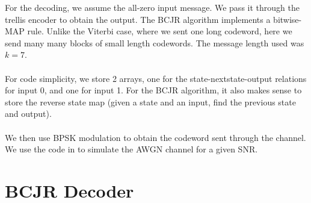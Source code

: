 \documentclass[paper=a4, fontsize=12pt]{scrartcl} %
\numberwithin{equation}{section} %
\numberwithin{figure}{section} %
\numberwithin{table}{section} %
\begin{document}
For the decoding, we assume the all-zero input message. We pass it through the trellis encoder to obtain the output. 
The BCJR algorithm implements a bitwise-MAP rule. Unlike the Viterbi case, where we sent one long codeword, here we send many many blocks of small length codewords. The message length used was $k=7$. 
\\ \\
For code simplicity, we store 2 arrays, one for the state-nextstate-output relations for input 0, and one for input 1. For the BCJR algorithm, it also makes sense to store the reverse state map (given a state and an input, find the previous state and output).
\\ \\
We then use BPSK modulation to obtain the codeword sent through the channel. We use the code in \cite{AWGN} to simulate the AWGN channel for a given SNR. 



\section{BCJR Decoder} 
\end{document}
